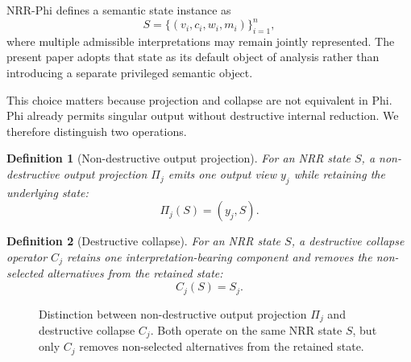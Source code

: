 \documentclass[11pt,a4paper]{article}
\newtheorem{definition}{Definition}
\begin{document}
NRR-Phi \cite{saito2026phi} defines a semantic state instance as
\begin{equation}
S = \{(v_i, c_i, w_i, m_i)\}_{i=1}^{n},
\end{equation}
where multiple admissible interpretations may remain jointly represented. The present paper adopts that state as its default object of analysis rather than introducing a separate privileged semantic object.

This choice matters because projection and collapse are not equivalent in Phi. Phi already permits singular output without destructive internal reduction. We therefore distinguish two operations.

\begin{definition}[Non-destructive output projection]
For an NRR state $S$, a non-destructive output projection $\Pi_j$ emits one output view $y_j$ while retaining the underlying state:
\begin{equation}
\Pi_j(S) = (y_j, S).
\end{equation}
\end{definition}

\begin{definition}[Destructive collapse]
For an NRR state $S$, a destructive collapse operator $C_j$ retains one interpretation-bearing component and removes the non-selected alternatives from the retained state:
\begin{equation}
C_j(S) = S_j.
\end{equation}
\end{definition}
\begin{figure}[t]
\centering
{}
\caption{Distinction between non-destructive output projection $\Pi_j$ and destructive collapse $C_j$. Both operate on the same NRR state $S$, but only $C_j$ removes non-selected alternatives from the retained state.}
\label{fig:projection_vs_collapse}
\end{figure}
\end{document}
